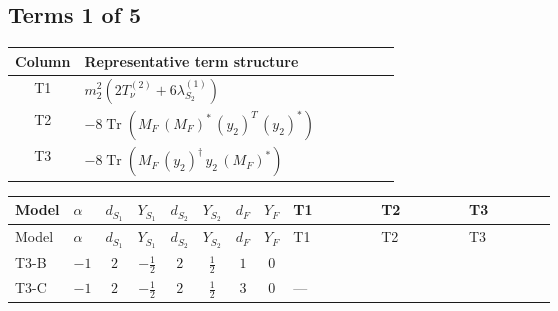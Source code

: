 \documentclass[8pt]{article}
\begin{document}
\begin{landscape}
\subsection*{Terms 1 of 5}
\begin{center}
\begin{tabular}{@{}c >{\raggedright\arraybackslash}p{0.82\linewidth}@{}}
\toprule
Column & Representative term structure \\
\midrule
T1 & \(\displaystyle {m_2^2} (2 T_{\nu}^{(2)}+6 {\lambda_{S_2}^{(1)}})\) \\
\midrule
T2 & \(\displaystyle -8 \operatorname{Tr}\!\left({M_F}\,\left({M_F}\right)^{*}\,\left({y_2}\right)^{T}\,\left({y_2}\right)^{*}\right)\) \\
\midrule
T3 & \(\displaystyle -8 \operatorname{Tr}\!\left({M_F}\,\left({y_2}\right)^{\dagger}\,{y_2}\,\left({M_F}\right)^{*}\right)\) \\
\midrule
\bottomrule
\end{tabular}
\end{center}
\smallskip
\tiny
\begin{longtable}{@{}llcccccc >{\raggedright\arraybackslash}p{0.21\linewidth} >{\raggedright\arraybackslash}p{0.21\linewidth} >{\raggedright\arraybackslash}p{0.21\linewidth}@{}}
\toprule
Model & $\alpha$ & $d_{S_1}$ & $Y_{S_1}$ & $d_{S_2}$ & $Y_{S_2}$ & $d_F$ & $Y_F$ & T1 & T2 & T3 \\
\midrule
\endfirsthead
\toprule
Model & $\alpha$ & $d_{S_1}$ & $Y_{S_1}$ & $d_{S_2}$ & $Y_{S_2}$ & $d_F$ & $Y_F$ & T1 & T2 & T3 \\
\midrule
\endhead
T3-B & $-1$ & $2$ & $-\frac{1}{2}$ & $2$ & $\frac{1}{2}$ & $1$ & $0$ & \scriptsize\adjustbox{max width=\linewidth}{$\begin{gathered} {m_2^2} (2 T_{\nu}^{(2)}+6 {\lambda_{S_2}^{(1)}})\end{gathered}$} & \scriptsize\adjustbox{max width=\linewidth}{$\begin{gathered} -8 \operatorname{Tr}\!\left({M_F}\,\left({M_F}\right)^{*}\,\left({y_2}\right)^{T}\,\left({y_2}\right)^{*}\right)\end{gathered}$} & \scriptsize\adjustbox{max width=\linewidth}{$\begin{gathered} -8 \operatorname{Tr}\!\left({M_F}\,\left({y_2}\right)^{\dagger}\,{y_2}\,\left({M_F}\right)^{*}\right)\end{gathered}$} \\
\midrule
T3-C & $-1$ & $2$ & $-\frac{1}{2}$ & $2$ & $\frac{1}{2}$ & $3$ & $0$ & --- & \scriptsize\adjustbox{max width=\linewidth}{$\begin{gathered} -12 \operatorname{Tr}\!\left({M_F}\,\left({M_F}\right)^{*}\,\left({y_2}\right)^{T}\,\left({y_2}\right)^{*}\right)\end{gathered}$} & \scriptsize\adjustbox{max width=\linewidth}{$\begin{gathered} -12 \operatorname{Tr}\!\left({M_F}\,\left({y_2}\right)^{\dagger}\,{y_2}\,\left({M_F}\right)^{*}\right)\end{gathered}$} \\

\end{longtable}
\end{landscape}
\end{document}
